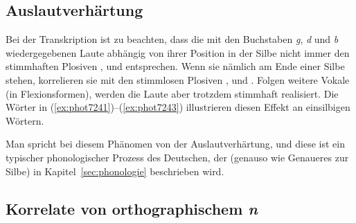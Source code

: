 \subsection{Auslautverhärtung}

\label{sec:auslautverhaertungphonetik}


Bei der Transkription ist zu beachten, dass die mit den Buchstaben \textit{g}, \textit{d} und \textit{b} wiedergegebenen Laute abhängig von ihrer Position in der Silbe nicht immer den stimmhaften Plosiven \textipa{[g]}, \textipa{[d]} und \textipa{[b]} entsprechen.
Wenn sie nämlich am Ende einer Silbe stehen, korrelieren sie mit den stimmlosen Plosiven \textipa{[k]}, \textipa{[t]} und \textipa{[p]}.
Folgen weitere Vokale (\zB in Flexionsformen), werden die Laute aber trotzdem stimmhaft realisiert.
Die Wörter in (\ref{ex:phot7241})--(\ref{ex:phot7243}) illustrieren diesen Effekt an einsilbigen Wörtern.

\newpage

\begin{exe}
  \ex\label{ex:phot7241}
  \begin{xlist}
  \end{xlist}
  \ex\label{ex:phot7242}
  \begin{xlist}
  \end{xlist}
  \ex\label{ex:phot7243}
  \begin{xlist}
  \end{xlist}
\end{exe}

Man spricht bei diesem Phänomen von der Auslautverhärtung, und diese ist ein typischer phonologischer Prozess des Deutschen, der (genauso wie Genaueres zur Silbe) in Kapitel~\ref{sec:phonologie} beschrieben wird.

\subsection{Korrelate von orthographischem \textit{n}}

\label{sec:realisn}

